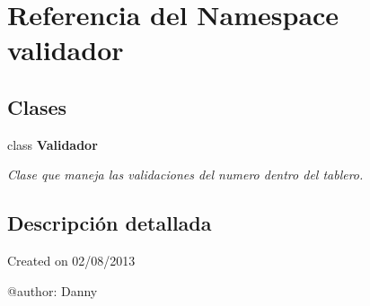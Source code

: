\section{Referencia del Namespace validador}
\label{namespacevalidador}
\subsection*{Clases}
\begin{DoxyCompactItemize}
\item 
class {\bf Validador}
\begin{DoxyCompactList}\small\item\em Clase que maneja las validaciones del numero dentro del tablero. \end{DoxyCompactList}\end{DoxyCompactItemize}


\subsection{Descripción detallada}
\begin{DoxyVerb}Created on 02/08/2013

@author: Danny
\end{DoxyVerb}
 
